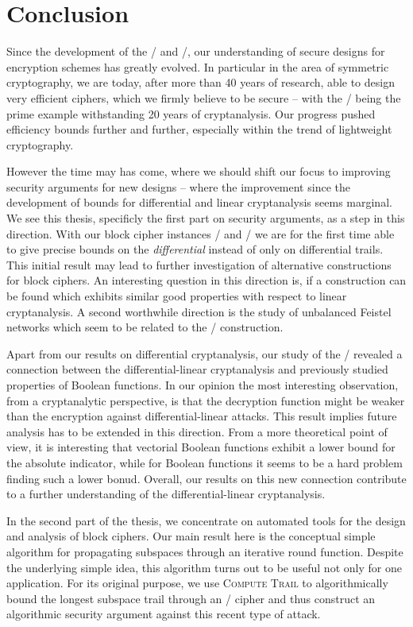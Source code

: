 \chapter{Conclusion}\label{ch:conclusion}
Since the development of the \DES/ and \AES/, our understanding of secure designs for encryption schemes has greatly evolved.
In particular in the area of symmetric cryptography, we are today, after more than 40 years of research, able to design very efficient ciphers, which we firmly believe to be secure -- with the \AES/ being the prime example withstanding 20 years of cryptanalysis.
Our progress pushed efficiency bounds further and further, especially within the trend of lightweight cryptography.

However the time may has come, where we should shift our focus to improving security arguments for new designs -- where the improvement since the development of bounds for differential and linear cryptanalysis seems marginal.
We see this thesis, specificly the first part on security arguments, as a step in this direction.
With our block cipher instances \bison/ and \wisent/ we are for the first time able to give precise bounds on the \emph{differential} instead of only on differential trails.
This initial result may lead to further investigation of alternative constructions for block ciphers.
An interesting question in this direction is, if a construction can be found which exhibits similar good properties with respect to linear cryptanalysis.
A second worthwhile direction is the study of unbalanced Feistel networks which seem to be related to the \WSN/ construction.

Apart from our results on differential cryptanalysis, our study of the \ACT/ revealed a connection between the differential-linear cryptanalysis and previously studied properties of Boolean functions.
In our opinion the most interesting observation, from a cryptanalytic perspective, is that the decryption function might be weaker than the encryption against differential-linear attacks.
This result implies future analysis has to be extended in this direction.
From a more theoretical point of view, it is interesting that vectorial Boolean functions exhibit a lower bound for the absolute indicator, while for Boolean functions it seems to be a hard problem finding such a lower bonud.
Overall, our results on this new connection contribute to a further understanding of the differential-linear cryptanalysis.

In the second part of the thesis, we concentrate on automated tools for the design and analysis of block ciphers.
Our main result here is the conceptual simple algorithm for propagating subspaces through an iterative round function.
Despite the underlying simple idea, this algorithm turns out to be useful not only for one application.
For its original purpose, we use \textsc{Compute Trail} to algorithmically bound the longest subspace trail through an \SPN/ cipher and thus construct an algorithmic security argument against this recent type of attack.

